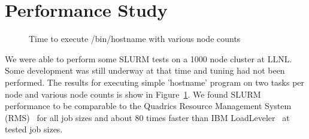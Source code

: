 \section{Performance Study}

\begin{figure}[htb]
\centerline{}
\caption{Time to execute /bin/hostname with various node counts}
\label{timing}
\end{figure}

We were able to perform some SLURM tests on a 1000 node cluster at LLNL.
Some development was still underway at that time and 
tuning had not been performed. The results for executing simple 'hostname' program 
on two tasks per node and various node counts is show 
in Figure~\ref{timing}. We found SLURM performance to be comparable 
to the Quadrics Resource Management System (RMS)~\cite{RMS} 
for all job sizes and about 80 times faster than IBM 
LoadLeveler~\cite{LoadLevelerWeb,LoadLevelerManual} at tested job sizes.
